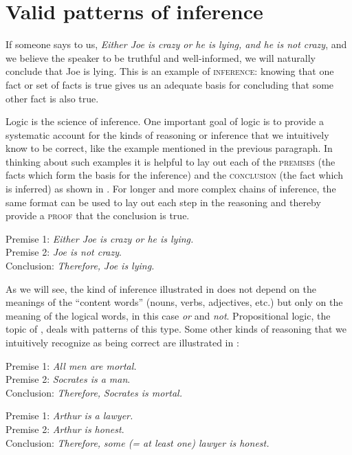 \section{Valid patterns of inference}\label{sec:4.2}

If someone says to us, \textit{Either Joe is crazy or he is lying, and he is not crazy}, and we believe the speaker to be truthful and well-informed, we will naturally conclude that Joe is lying. This is an example of \textsc{inference}: knowing that one fact or set of facts is true gives us an adequate basis for concluding that some other fact is also true.



Logic is the science of inference. One important goal of logic is to provide a systematic account for the kinds of reasoning or inference that we intuitively know to be correct, like the example mentioned in the previous paragraph. In thinking about such examples it is helpful to lay out each of the \textsc{premises} (the facts which form the basis for the inference) and the \textsc{conclusion} (the fact which is inferred) as shown in . For longer and more complex chains of inference, the same format can be used to lay out each step in the reasoning and thereby provide a \textsc{proof} that the conclusion is true.


\ea \label{ex:4.1}
Premise 1: \textit{Either Joe is crazy or he is lying.}\\
Premise 2: \textit{Joe is not crazy}.\\
\FelixHRule
Conclusion: \textit{Therefore,} \textit{Joe is lying.}
\z


As we will see, the kind of inference illustrated in  does not depend on the meanings of the “content words” (nouns, verbs, adjectives, etc.) but only on the meaning of the logical words, in this case \textit{or} and \textit{not}. Propositional logic, the topic of , deals with patterns of this type. Some other kinds of reasoning that we intuitively recognize as being correct are illustrated in :


\ea \label{ex:4.2}
\ea  Premise 1: \textit{All men are mortal.}\\
Premise 2: \textit{Socrates is a man}.\\
\FelixHRule
Conclusion: \textit{Therefore,} \textit{Socrates is mortal.}
\bigskip 

\ex Premise 1: \textit{Arthur is a lawyer.}\\
Premise 2: \textit{Arthur is honest}.\\
\FelixHRule
Conclusion: \textit{Therefore,} \textit{some (= at least one) lawyer is honest.}
                       \z
\z


